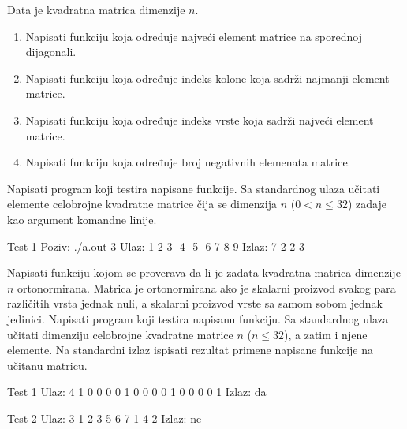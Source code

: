 \begin{Exercise}[label=323]
Data je kvadratna matrica dimenzije $n$.
\begin{enumerate}
\item Napisati funkciju koja određuje najveći element matrice na sporednoj dijagonali.
\item Napisati funkciju koja određuje indeks kolone koja sadrži najmanji element matrice.
\item Napisati funkciju koja određuje indeks vrste koja sadrži najveći element matrice.
\item Napisati funkciju koja određuje broj negativnih elemenata matrice.
\end{enumerate}
Napisati program koji testira napisane funkcije. Sa standardnog
ulaza učitati elemente celobrojne kvadratne matrice čija
se dimenzija $n$ ($0<n\leq 32$) zadaje kao argument
komandne linije.

\begin{minitest}
\begin{test}{Test 1}
Poziv:  ./a.out 3
Ulaz:   1 2 3
        -4 -5 -6
        7 8 9
Izlaz:  7 2 2 3
\end{test}
\end{minitest}
\end{Exercise}
\begin{Answer}[ref=323]
\end{Answer}

\begin{Exercise}[label=324]
Napisati funkciju kojom se proverava da li je zadata kvadratna
matrica dimenzije $n$ ortonormirana. Matrica je ortonormirana
ako je skalarni proizvod svakog para različitih vrsta jednak
nuli, a skalarni proizvod vrste sa samom sobom jednak jedinici.
Napisati program koji testira napisanu funkciju. Sa standardnog
ulaza učitati dimenziju celobrojne kvadratne matrice $n$
($n \leq 32$), a zatim i njene elemente. Na standardni izlaz
ispisati rezultat primene napisane funkcije na učitanu
matricu.

\begin{minitest}
\begin{test}{Test 1}
Ulaz:  4
       1 0 0 0
       0 1 0 0
       0 0 1 0
       0 0 0 1
Izlaz: da
\end{test}
\end{minitest}
\begin{minitest}
\begin{test}{Test 2}
Ulaz:  3
       1 2 3
       5 6 7
       1 4 2
Izlaz: ne
\end{test}
\end{minitest}
\end{Exercise}
\begin{Answer}[ref=324]
\end{Answer}


